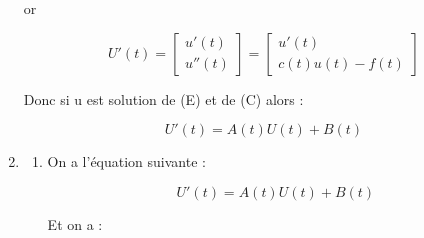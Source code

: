 \documentclass[12pt, letterpaper]{article}
\begin{document}
\begin{enumerate}
  or

  \begin{equation*}
    U'(t) = \left[
    \begin{array}{l}
      u'(t) \\
      u''(t)
    \end{array}
    \right]
    =
    \left[
    \begin{array}{l}
      u'(t) \\
      c(t)u(t) - f(t)
    \end{array}
    \right]
  \end{equation*}

  Donc si u est solution de (E) et de (C) alors :

  \begin{equation*}
    U'(t) = A(t)U(t) + B(t)
  \end{equation*}

\item

  \begin{enumerate}
  \item
    On a l'équation suivante :

    \begin{equation*}
      U'(t) = A(t)U(t) + B(t)
    \end{equation*}

    Et on a :
    

\end{enumerate}
\end{enumerate}
\end{document}
